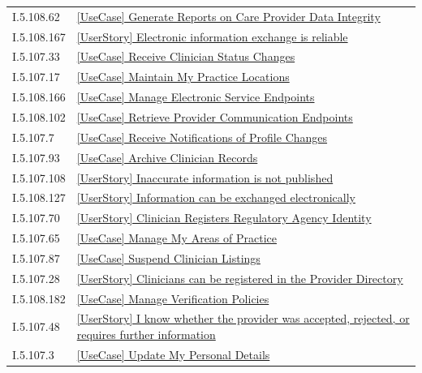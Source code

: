 \begin{longtable}{p{.22\linewidth}p{.73\linewidth}}
I.5.108.62 & \hyperref[element:ae05cccff38f4d3cbbe1f55a008c6141]{[UseCase] Generate Reports on Care Provider Data Integrity} \\
I.5.108.167 & \hyperref[element:af0bd67707454362a88bdb914d1e8702]{[UserStory] Electronic information exchange is reliable} \\
I.5.107.33 & \hyperref[element:af4d06d5008e49c9bacf861ff645daaf]{[UseCase] Receive Clinician Status Changes} \\
I.5.107.17 & \hyperref[element:b312c832ff9e4f94ab9bf4568134a25f]{[UseCase] Maintain My Practice Locations} \\
I.5.108.166 & \hyperref[element:b389c31f47b54eb7b2e847c62a519d88]{[UseCase] Manage Electronic Service Endpoints} \\
I.5.108.102 & \hyperref[element:b3ec804553764605bf7754c7747a99b6]{[UseCase] Retrieve Provider Communication Endpoints} \\
I.5.107.7 & \hyperref[element:b6db0ea9db2a484d8d877e8042f4ca64]{[UseCase] Receive Notifications of Profile Changes} \\
I.5.107.93 & \hyperref[element:bb8089c9b3984fbfb3ca1e9149a17adc]{[UseCase] Archive Clinician Records} \\
I.5.107.108 & \hyperref[element:bcc77981edfc4dd58edf175a8e24a9d6]{[UserStory] Inaccurate information is not published} \\
I.5.108.127 & \hyperref[element:be73174f27b14db2bf1f7c33de06b206]{[UserStory] Information can be exchanged electronically} \\
I.5.107.70 & \hyperref[element:c05af47edf0747c3be6cd4ba4a08d321]{[UserStory] Clinician Registers Regulatory Agency Identity} \\
I.5.107.65 & \hyperref[element:c3dd07616df84a8ca66ce87f08ea3845]{[UseCase] Manage My Areas of Practice} \\
I.5.107.87 & \hyperref[element:c3df6388a04047f099b6d6810ce7d325]{[UseCase] Suspend Clinician Listings} \\
I.5.107.28 & \hyperref[element:c43eaace85f043c4a3794a2e7b39acb7]{[UserStory] Clinicians can be registered in the Provider Directory} \\
I.5.108.182 & \hyperref[element:c525d7dddba74e97a0598a1e174eb438]{[UseCase] Manage Verification Policies} \\
I.5.107.48 & \hyperref[element:c578222257f64b31a13feaedeed2b20c]{[UserStory] I know whether the provider was accepted, rejected, or requires further information} \\
I.5.107.3 & \hyperref[element:c9d3e40bf2eb4871a7a737a20efbfe35]{[UseCase] Update My Personal Details} \\

\end{longtable}
